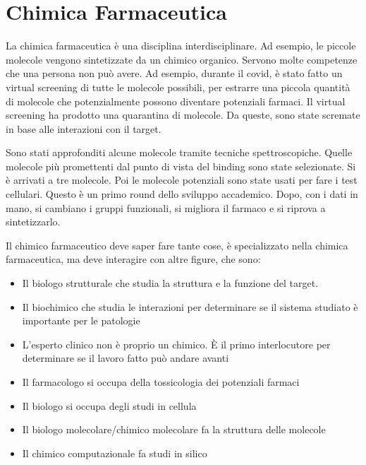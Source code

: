 \chapter{Chimica Farmaceutica}

La chimica farmaceutica è una disciplina interdisciplinare. Ad esempio,
le piccole molecole vengono sintetizzate da un chimico organico. Servono
molte competenze che una persona non può avere.
Ad esempio, durante il covid, è stato fatto un virtual screening di
tutte le molecole possibili, per estrarre una piccola quantità di
molecole che potenzialmente possono diventare potenziali farmaci. Il
virtual screening ha prodotto una quarantina di molecole. Da queste,
sono state scremate in base alle interazioni con il target.

Sono stati approfonditi alcune molecole tramite tecniche
spettroscopiche. Quelle molecole più promettenti dal punto di vista del
binding sono state selezionate. Si è arrivati a tre molecole.
Poi le molecole potenziali sono state usati per fare i test cellulari.
Questo è un primo round dello sviluppo accademico. Dopo, con i dati in
mano, si cambiano i gruppi funzionali, si migliora il farmaco e si riprova a sintetizzarlo.


Il chimico farmaceutico deve saper fare tante cose, è specializzato
nella chimica farmaceutica, ma deve interagire con altre figure, che sono:
\begin{itemize}
    \item Il biologo strutturale che studia la struttura e
    la funzione del target.
    \item Il biochimico che studia le interazioni per
    determinare se il sistema studiato è importante per le patologie
    \item L'esperto clinico non è proprio un chimico. È il primo interlocutore per
    determinare se il lavoro fatto può andare avanti 
    \item Il farmacologo si
    occupa della tossicologia dei potenziali farmaci
    \item Il biologo si occupa
    degli studi in cellula
    \item Il biologo molecolare/chimico molecolare fa
    la struttura delle molecole
    \item Il chimico computazionale fa studi in
    silico
\end{itemize}

